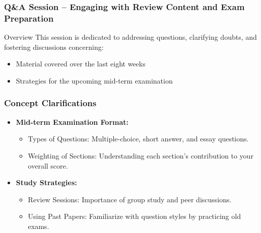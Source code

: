 \documentclass{beamer}
\begin{document}
\begin{frame}[fragile]
    \frametitle{Q\&A Session – Engaging with Review Content and Exam Preparation}
    \begin{block}{Overview}
        This session is dedicated to addressing questions, clarifying doubts, and fostering discussions concerning:
        \begin{itemize}
            \item Material covered over the last eight weeks
            \item Strategies for the upcoming mid-term examination
        \end{itemize}
    \end{block}
\end{frame}

\begin{frame}[fragile]
    \frametitle{Concept Clarifications}
    \begin{itemize}
        \item \textbf{Mid-term Examination Format:}
            \begin{itemize}
                \item Types of Questions: Multiple-choice, short answer, and essay questions.
                \item Weighting of Sections: Understanding each section's contribution to your overall score.
            \end{itemize}
        \item \textbf{Study Strategies:}
            \begin{itemize}
                \item Review Sessions: Importance of group study and peer discussions.
                \item Using Past Papers: Familiarize with question styles by practicing old exams.
            \end{itemize}
    \end{itemize}
\end{frame}
\end{document}
